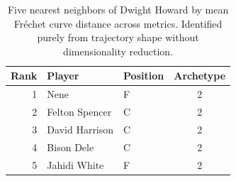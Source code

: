 \begin{table}[htbp]
  \centering\small
  \begin{tabular}{rllc}
    \toprule
    Rank & Player & Position & Archetype \\
    \midrule
    1 & Nene & F & 2 \\
    2 & Felton Spencer & C & 2 \\
    3 & David Harrison & C & 2 \\
    4 & Bison Dele & C & 2 \\
    5 & Jahidi White & F & 2 \\
    \bottomrule
  \end{tabular}
  \caption{Five nearest neighbors of Dwight Howard by mean Fr\'{e}chet curve distance across metrics. Identified purely from trajectory shape without dimensionality reduction.}
  \label{tab:Dwight_Howard_frechet_curve_neighbors}
\end{table}

